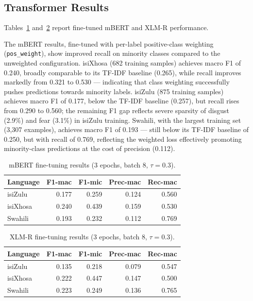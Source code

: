 \documentclass[11pt]{article}
\begin{document}
\subsection{Transformer Results}

Tables~\ref{tab:mbert} and~\ref{tab:xlmr} report fine-tuned mBERT and
XLM-R performance.

The mBERT results, fine-tuned with per-label positive-class weighting
(\texttt{pos\_weight}), show improved recall on minority classes compared
to the unweighted configuration.
isiXhosa (682 training samples) achieves macro F1 of 0.240, broadly
comparable to its TF-IDF baseline (0.265), while recall improves markedly
from 0.321 to 0.530 --- indicating that class weighting successfully
pushes predictions towards minority labels.
isiZulu (875 training samples) achieves macro F1 of 0.177, below the
TF-IDF baseline (0.257), but recall rises from 0.290 to 0.560; the
remaining F1 gap reflects severe sparsity of disgust (2.9\%) and fear
(3.1\%) in isiZulu training.
Swahili, with the largest training set (3{,}307 examples), achieves macro
F1 of 0.193 --- still below its TF-IDF baseline of 0.250, but with
recall of 0.769, reflecting the weighted loss effectively promoting
minority-class predictions at the cost of precision (0.112).

\begin{table}[h]
\centering
\small
\begin{tabular}{lrrrr}
\toprule
\textbf{Language} & \textbf{F1-mac} & \textbf{F1-mic} & \textbf{Prec-mac} &
  \textbf{Rec-mac} \\
\midrule
isiZulu  & 0.177 & 0.259 & 0.124 & 0.560 \\
isiXhosa & 0.240 & 0.439 & 0.159 & 0.530 \\
Swahili  & 0.193 & 0.232 & 0.112 & 0.769 \\
\bottomrule
\end{tabular}
\caption{mBERT fine-tuning results (3 epochs, batch 8, $\tau{=}0.3$).}
\label{tab:mbert}
\end{table}

\begin{table}[h]
\centering
\small
\begin{tabular}{lrrrr}
\toprule
\textbf{Language} & \textbf{F1-mac} & \textbf{F1-mic} & \textbf{Prec-mac} &
  \textbf{Rec-mac} \\
\midrule
isiZulu  & 0.135 & 0.218 & 0.079 & 0.547 \\
isiXhosa & 0.222 & 0.447 & 0.147 & 0.500 \\
Swahili  & 0.223 & 0.249 & 0.136 & 0.765 \\
\bottomrule
\end{tabular}
\caption{XLM-R fine-tuning results (3 epochs, batch 8, $\tau{=}0.3$).}
\label{tab:xlmr}
\end{table}
\end{document}
